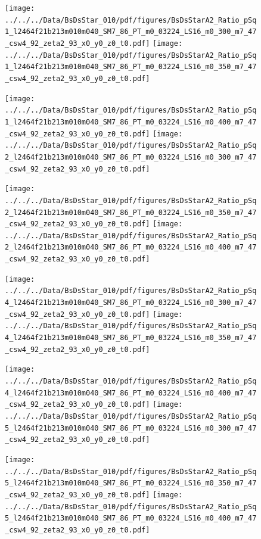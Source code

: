 \documentclass[a4paper,10pt]{article}
\begin{document}
\begin{figure}[p]
 \texttt{[image: ../../../Data/BsDsStar\_010/pdf/figures/BsDsStarA2\_Ratio\_pSq1\_l2464f21b213m010m040\_SM7\_86\_PT\_m0\_03224\_LS16\_m0\_300\_m7\_47\_csw4\_92\_zeta2\_93\_x0\_y0\_z0\_t0.pdf]} 
 \texttt{[image: ../../../Data/BsDsStar\_010/pdf/figures/BsDsStarA2\_Ratio\_pSq1\_l2464f21b213m010m040\_SM7\_86\_PT\_m0\_03224\_LS16\_m0\_350\_m7\_47\_csw4\_92\_zeta2\_93\_x0\_y0\_z0\_t0.pdf]} 
 \end{figure}
\begin{figure}[p]
 \texttt{[image: ../../../Data/BsDsStar\_010/pdf/figures/BsDsStarA2\_Ratio\_pSq1\_l2464f21b213m010m040\_SM7\_86\_PT\_m0\_03224\_LS16\_m0\_400\_m7\_47\_csw4\_92\_zeta2\_93\_x0\_y0\_z0\_t0.pdf]} 
 \texttt{[image: ../../../Data/BsDsStar\_010/pdf/figures/BsDsStarA2\_Ratio\_pSq2\_l2464f21b213m010m040\_SM7\_86\_PT\_m0\_03224\_LS16\_m0\_300\_m7\_47\_csw4\_92\_zeta2\_93\_x0\_y0\_z0\_t0.pdf]} 
 \end{figure}
\begin{figure}[p]
 \texttt{[image: ../../../Data/BsDsStar\_010/pdf/figures/BsDsStarA2\_Ratio\_pSq2\_l2464f21b213m010m040\_SM7\_86\_PT\_m0\_03224\_LS16\_m0\_350\_m7\_47\_csw4\_92\_zeta2\_93\_x0\_y0\_z0\_t0.pdf]} 
 \texttt{[image: ../../../Data/BsDsStar\_010/pdf/figures/BsDsStarA2\_Ratio\_pSq2\_l2464f21b213m010m040\_SM7\_86\_PT\_m0\_03224\_LS16\_m0\_400\_m7\_47\_csw4\_92\_zeta2\_93\_x0\_y0\_z0\_t0.pdf]} 
 \end{figure}
\clearpage
\begin{figure}[p]
 \texttt{[image: ../../../Data/BsDsStar\_010/pdf/figures/BsDsStarA2\_Ratio\_pSq4\_l2464f21b213m010m040\_SM7\_86\_PT\_m0\_03224\_LS16\_m0\_300\_m7\_47\_csw4\_92\_zeta2\_93\_x0\_y0\_z0\_t0.pdf]} 
 \texttt{[image: ../../../Data/BsDsStar\_010/pdf/figures/BsDsStarA2\_Ratio\_pSq4\_l2464f21b213m010m040\_SM7\_86\_PT\_m0\_03224\_LS16\_m0\_350\_m7\_47\_csw4\_92\_zeta2\_93\_x0\_y0\_z0\_t0.pdf]} 
 \end{figure}
\begin{figure}[p]
 \texttt{[image: ../../../Data/BsDsStar\_010/pdf/figures/BsDsStarA2\_Ratio\_pSq4\_l2464f21b213m010m040\_SM7\_86\_PT\_m0\_03224\_LS16\_m0\_400\_m7\_47\_csw4\_92\_zeta2\_93\_x0\_y0\_z0\_t0.pdf]} 
 \texttt{[image: ../../../Data/BsDsStar\_010/pdf/figures/BsDsStarA2\_Ratio\_pSq5\_l2464f21b213m010m040\_SM7\_86\_PT\_m0\_03224\_LS16\_m0\_300\_m7\_47\_csw4\_92\_zeta2\_93\_x0\_y0\_z0\_t0.pdf]} 
 \end{figure}
\begin{figure}[p]
 \texttt{[image: ../../../Data/BsDsStar\_010/pdf/figures/BsDsStarA2\_Ratio\_pSq5\_l2464f21b213m010m040\_SM7\_86\_PT\_m0\_03224\_LS16\_m0\_350\_m7\_47\_csw4\_92\_zeta2\_93\_x0\_y0\_z0\_t0.pdf]} 
 \texttt{[image: ../../../Data/BsDsStar\_010/pdf/figures/BsDsStarA2\_Ratio\_pSq5\_l2464f21b213m010m040\_SM7\_86\_PT\_m0\_03224\_LS16\_m0\_400\_m7\_47\_csw4\_92\_zeta2\_93\_x0\_y0\_z0\_t0.pdf]} 
 \end{figure}
\clearpage
\clearpage
\end{document}

